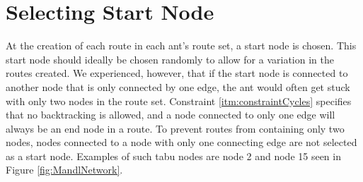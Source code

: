 \section{Selecting Start Node}

At the creation of each route in each ant's route set, a start node is chosen. This start node should ideally be chosen randomly to allow for a variation in the routes created. We experienced, however, that if the start node is connected to another node that is only connected by one edge, the ant would often get stuck with only two nodes in the route set. Constraint \vref{itm:constraintCycles} specifies that no backtracking is allowed, and a node connected to only one edge will always be an end node in a route. To prevent routes from containing only two nodes, nodes connected to a node with only one connecting edge are not selected as a start node. Examples of such tabu nodes are node 2 and node 15 seen in Figure \vref{fig:MandlNetwork}. 